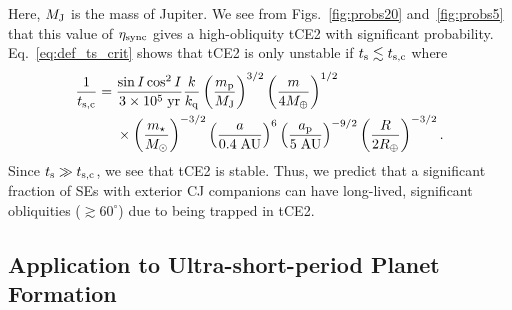 \documentclass[
        fleqn,
        usenatbib,
    ]{mnras}
\newcommand*{\p}[1]{\left(#1\right)}
\begin{document}
Here, $M_{\rm J}$ is the mass of Jupiter. We see from Figs.~\ref{fig:probs20}
and~\ref{fig:probs5} that this value of $\eta_{\rm sync}$ gives a high-obliquity
tCE2 with significant probability. Eq.~\eqref{eq:def_ts_crit} shows that tCE2 is
only unstable if $t_{\rm s} \lesssim t_{\rm s, c}$ where
\begin{align}
    \frac{1}{t_{\rm s, c}} ={}& \frac{\sin I \cos^2 I}{3 \times
        10^5\;\mathrm{yr}}
            \frac{k}{k_{\rm q}}
            \p{\frac{m_{\rm p}}{M_{\rm J}}}^{3/2}
            \p{\frac{m}{4 M_{\oplus}}}^{1/2}\nonumber\\
        &\times \p{\frac{m_\star}{M_{\odot}}}^{-3/2}
            \p{\frac{a}{0.4\;\mathrm{AU}}}^6
            \p{\frac{a_{\rm p}}{5\;\mathrm{AU}}}^{-9/2}
            \p{\frac{R}{2 R_{\oplus}}}^{-3/2}.
\end{align}
Since $t_{\rm s} \gg t_{\rm s, c}$, we see that tCE2 is stable. Thus, we predict
that a significant fraction of SEs with exterior CJ companions can have
long-lived, significant obliquities ($\gtrsim 60^\circ$) due to being trapped in
tCE2.


\subsection{Application to Ultra-short-period Planet Formation
}\label{ss:disc_usp}
\end{document}
